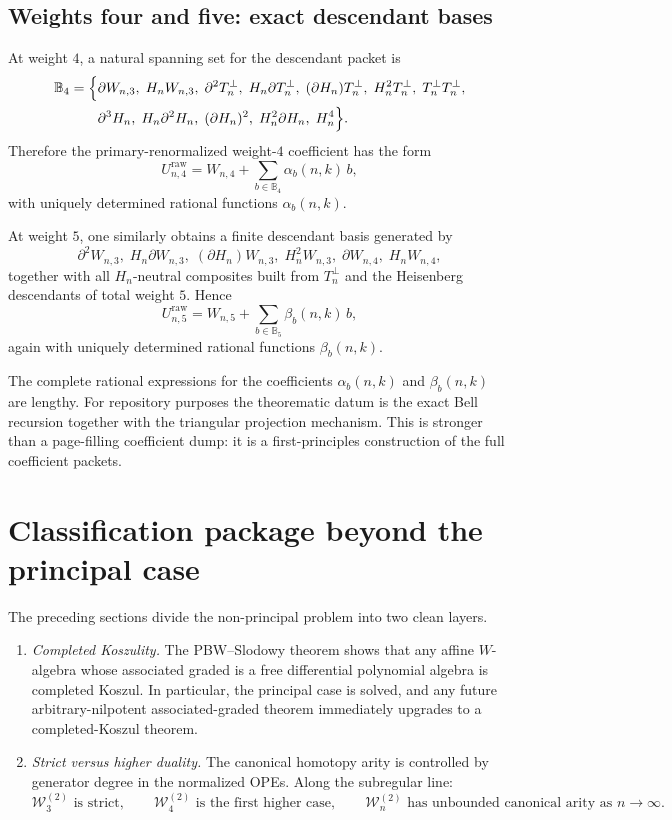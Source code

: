 \subsection{Weights four and five: exact descendant bases}

At weight $4$, a natural spanning set for the descendant packet is
\begin{align*}
\mathbb B_4
=
\Bigl\{
&\partial W_{n,3},\;
H_nW_{n,3},\;
\partial^2T_n^\perp,\;
H_n\partial T_n^\perp,\;
(\partial H_n)T_n^\perp,\;
H_n^2T_n^\perp,\;
T_n^\perp T_n^\perp,
\\
&\partial^3H_n,\;
H_n\partial^2H_n,\;
(\partial H_n)^2,\;
H_n^2\partial H_n,\;
H_n^4
\Bigr\}.
\end{align*}
Therefore the primary-renormalized weight-$4$ coefficient has the form
\[
U_{n,4}^{\mathrm{raw}}=W_{n,4}+\sum_{b\in\mathbb B_4}\alpha_b(n,k)\,b,
\]
with uniquely determined rational functions $\alpha_b(n,k)$.

At weight $5$, one similarly obtains a finite descendant basis generated by
\[
\partial^2W_{n,3},\;
H_n\partial W_{n,3},\;
(\partial H_n)W_{n,3},\;
H_n^2W_{n,3},\;
\partial W_{n,4},\;
H_nW_{n,4},
\]
together with all $H_n$-neutral composites built from $T_n^\perp$ and the
Heisenberg descendants of total weight $5$.  Hence
\[
U_{n,5}^{\mathrm{raw}}=W_{n,5}+\sum_{b\in\mathbb B_5}\beta_b(n,k)\,b,
\]
again with uniquely determined rational functions $\beta_b(n,k)$.

\begin{remark}
The complete rational expressions for the coefficients
$\alpha_b(n,k)$ and $\beta_b(n,k)$ are lengthy.  For repository purposes the
theorematic datum is the exact Bell recursion together with the triangular
projection mechanism.  This is stronger than a page-filling coefficient dump:
it is a first-principles construction of the full coefficient packets.
\end{remark}

\section{Classification package beyond the principal case}

The preceding sections divide the non-principal problem into two clean layers.

\begin{enumerate}[label=(\alph*)]
\item \emph{Completed Koszulity.}  The PBW--Slodowy theorem shows that any
  affine $W$-algebra whose associated graded is a free differential polynomial
  algebra is completed Koszul.  In particular, the principal case is solved, and
  any future arbitrary-nilpotent associated-graded theorem immediately upgrades
  to a completed-Koszul theorem.
\item \emph{Strict versus higher duality.}  The canonical homotopy arity is
  controlled by generator degree in the normalized OPEs.  Along the subregular
  line:
  \[
  \mathcal W_3^{(2)} \text{ is strict},\qquad
  \mathcal W_4^{(2)} \text{ is the first higher case},\qquad
  \mathcal W_n^{(2)} \text{ has unbounded canonical arity as } n\to\infty.
  \]
\end{enumerate}

